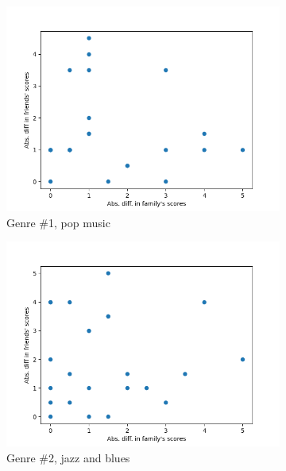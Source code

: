 \documentclass[12pt]{report}
\begin{document}
\begin{figure}[H]
\begin{centering}

\begin{subfigure}{0.3\textwidth}
  \centerline{\includegraphics[width=\textwidth]{Genre 1}}
  \caption{\small Genre \#1, pop music}
\end{subfigure}
\begin{subfigure}{0.3\textwidth}
  \centerline{\includegraphics[width=\textwidth,right]{Genre 2}}
  \caption{\small Genre \#2, jazz and blues}
\end{subfigure}
\begin{subfigure}{0.3\textwidth}

\end{subfigure}
\end{centering}
\end{figure}
\end{document}
